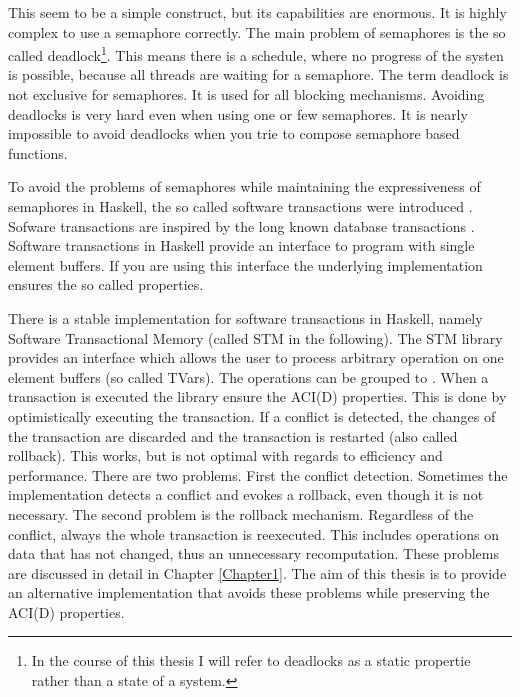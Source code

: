 This seem to be a simple construct, but its capabilities are enormous. It is highly complex to use a semaphore correctly.
The main problem of semaphores is the so called deadlock\footnote{In the course of this thesis I will refer to deadlocks as a static propertie rather than a state of a system.}. 
This means there is a schedule, where no progress of the systen is possible, because all threads are waiting for a semaphore. The term deadlock is not exclusive for semaphores.
It is used for all blocking mechanisms. Avoiding deadlocks is very hard even when using one or few semaphores. 
It is nearly impossible to avoid deadlocks when you trie to compose semaphore based functions.

To avoid the problems of semaphores while maintaining the expressiveness of semaphores in Haskell, the so called software transactions were introduced \parencite{STMBase}.
Sofware transactions are inspired by the long known database transactions \parencite{DBTrans}. Software transactions in Haskell provide an interface to program with 
single element buffers. If you are using this interface the underlying implementation ensures the so called  properties. 

There is a stable implementation for software transactions in Haskell, namely Software Transactional Memory (called STM in the following). The STM library provides 
an interface which allows the user to process arbitrary operation on one element buffers (so called TVars). The operations can be grouped to .
When a transaction is executed the library ensure the ACI(D) properties. This is done by optimistically executing the transaction.  
If a conflict is detected, the changes of the transaction are discarded and the transaction is restarted (also called rollback). 
This works, but is not optimal with regards to efficiency and performance. There are two problems. First the conflict detection. Sometimes the implementation detects 
a conflict and evokes a rollback, even though it is not necessary. The second problem is the rollback mechanism. Regardless of the conflict, always the whole transaction
is reexecuted. This includes operations on data that has not changed, thus an unnecessary recomputation. These problems are discussed in detail in Chapter \ref{Chapter1}. 
The aim of this thesis is to provide an alternative implementation that avoids these problems while preserving the ACI(D) properties.
